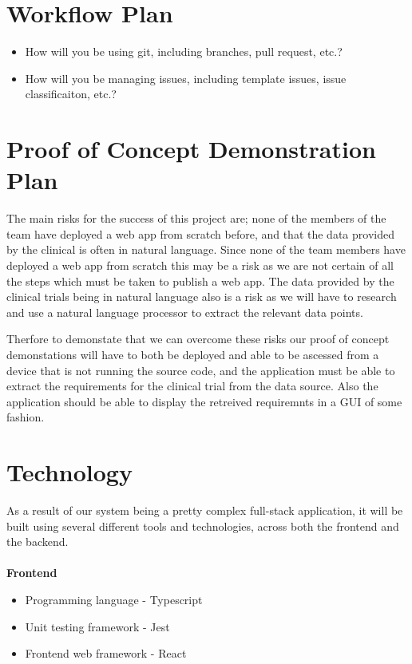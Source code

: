 \documentclass{article}
\begin{document}
	\section{Workflow Plan}

\begin{itemize}
	\item How will you be using git, including branches, pull request, etc.?
	\item How will you be managing issues, including template issues, issue
	classificaiton, etc.?
\end{itemize}

\section{Proof of Concept Demonstration Plan}

The main risks for the success of this project are; none of the members of the team have deployed a web app from scratch before, and that the data provided by the clinical is often in natural language. Since none of the team members have deployed a web app from scratch this may be a risk as we are not certain of all the steps which must be taken to publish a web app. The data provided by the clinical trials being in natural language also is a risk as we will have to research and use a natural language processor to extract the relevant data points. 

Therfore to demonstate that we can overcome these risks our proof of concept demonstations will have to both be deployed and able to be ascessed from a device that is not running the source code, and the application must be able to extract the requirements for the clinical trial from the data source. Also the application should be able to display the retreived requiremnts in a GUI of some fashion.

\section{Technology}

As a result of our system being a pretty complex full-stack application, it will be built
using several different tools and technologies, across both the frontend and the backend.
\\~\\
\textbf{Frontend}

\begin{itemize}
	\item Programming language - Typescript
	\item Unit testing framework - Jest
	\item Frontend web framework - React\\
\end{itemize}
\end{document}
